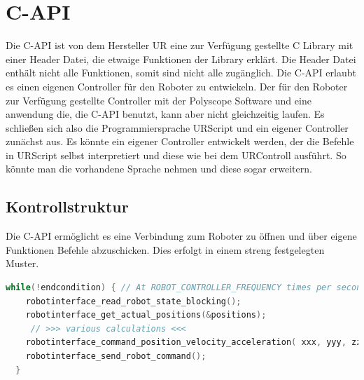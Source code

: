 \section{C-API}
\label{sec:rest_prinzip_gru}

Die C-\ac{API} ist von dem Hersteller \ac{UR} eine zur Verfügung gestellte C \ac{Library} mit einer Header Datei, die etwaige Funktionen der Library erklärt. Die Header Datei enthält nicht alle Funktionen, somit sind nicht alle zugänglich. Die C-\ac{API} erlaubt es einen eigenen Controller für den Roboter zu entwickeln. Der für den Roboter zur Verfügung gestellte Controller mit der Polyscope Software und eine anwendung die, die C-\ac{API} benutzt, kann aber nicht gleichzeitig laufen. Es schließen sich also die Programmiersprache URScript  und ein eigener Controller zunächst aus. Es könnte ein eigener Controller entwickelt werden, der die Befehle in URScript selbst interpretiert und diese wie bei dem URControll ausführt. So könnte man die vorhandene Sprache nehmen und diese sogar erweitern.

\subsection{Kontrollstruktur}
\label{capi_control_loop_gru}	

Die C-\ac{API} ermöglicht es eine Verbindung zum Roboter zu öffnen und über eigene Funktionen Befehle abzuschicken. Dies erfolgt in einem streng festgelegten Muster.

\begin{lstlisting}[language=C,caption={Beispiel der Kontroll Struktur}, label=lst:robot_control_loop,captionpos=b]
  while(!endcondition) { // At ROBOT_CONTROLLER_FREQUENCY times per second
    robotinterface_read_robot_state_blocking();
    robotinterface_get_actual_positions(&positions);
     // >>> various calculations <<<
    robotinterface_command_position_velocity_acceleration( xxx, yyy, zzz);
    robotinterface_send_robot_command();
  }
\end{lstlisting}

